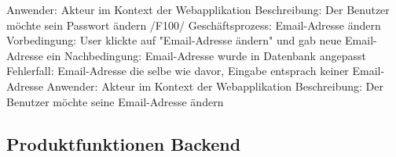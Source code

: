 Anwender: Akteur im Kontext der Webapplikation \newline
Beschreibung: Der Benutzer möchte sein Passwort ändern \newline \newline
/F100/ \newline
Geschäftsprozess: Email-Adresse ändern \newline
Vorbedingung: User klickte auf "Email-Adresse ändern" und gab neue Email-Adresse ein \newline
Nachbedingung: Email-Adresse wurde in Datenbank angepasst \newline
Fehlerfall: Email-Adresse die selbe wie davor, Eingabe entsprach keiner Email-Adresse \newline
Anwender: Akteur im Kontext der Webapplikation \newline
Beschreibung: Der Benutzer möchte seine Email-Adresse ändern \newline \newline

\subsection{Produktfunktionen Backend} 

